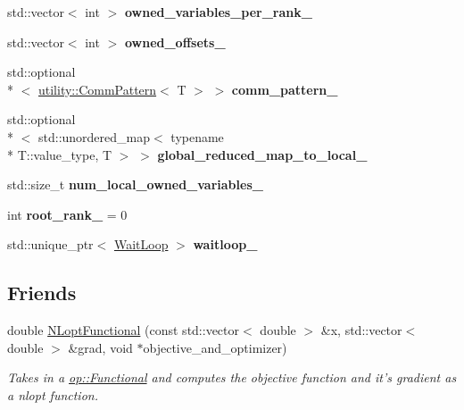 \begin{DoxyCompactItemize}
\item 
\hypertarget{classop_1_1NLopt_ad38e598bdc610c3dcc6c4611cf1333e1}{std\-::vector$<$ int $>$ {\bfseries owned\-\_\-variables\-\_\-per\-\_\-rank\-\_\-}}\label{classop_1_1NLopt_ad38e598bdc610c3dcc6c4611cf1333e1}

\item 
\hypertarget{classop_1_1NLopt_a1376429626ecfd58dea3ea99e0b258c9}{std\-::vector$<$ int $>$ {\bfseries owned\-\_\-offsets\-\_\-}}\label{classop_1_1NLopt_a1376429626ecfd58dea3ea99e0b258c9}

\item 
\hypertarget{classop_1_1NLopt_a6595246d545758fe572dc1f786155dd3}{std\-::optional\\*
$<$ \hyperlink{structop_1_1utility_1_1CommPattern}{utility\-::\-Comm\-Pattern}$<$ T $>$ $>$ {\bfseries comm\-\_\-pattern\-\_\-}}\label{classop_1_1NLopt_a6595246d545758fe572dc1f786155dd3}

\item 
\hypertarget{classop_1_1NLopt_a25e6ed69156a0554a3d705d263bcf46a}{std\-::optional\\*
$<$ std\-::unordered\-\_\-map$<$ typename \\*
T\-::value\-\_\-type, T $>$ $>$ {\bfseries global\-\_\-reduced\-\_\-map\-\_\-to\-\_\-local\-\_\-}}\label{classop_1_1NLopt_a25e6ed69156a0554a3d705d263bcf46a}

\item 
\hypertarget{classop_1_1NLopt_a8d375f203c2f7a4786d2ee3d17be4ec0}{std\-::size\-\_\-t {\bfseries num\-\_\-local\-\_\-owned\-\_\-variables\-\_\-}}\label{classop_1_1NLopt_a8d375f203c2f7a4786d2ee3d17be4ec0}

\item 
\hypertarget{classop_1_1NLopt_a77c36eaeb9124a0886f8224735684433}{int {\bfseries root\-\_\-rank\-\_\-} = 0}\label{classop_1_1NLopt_a77c36eaeb9124a0886f8224735684433}

\item 
\hypertarget{classop_1_1NLopt_a5441290e7186be77f81626bb31ba8fa2}{std\-::unique\-\_\-ptr$<$ \hyperlink{classop_1_1WaitLoop}{Wait\-Loop} $>$ {\bfseries waitloop\-\_\-}}\label{classop_1_1NLopt_a5441290e7186be77f81626bb31ba8fa2}

\end{DoxyCompactItemize}
\subsection*{Friends}
\begin{DoxyCompactItemize}
\item 
double \hyperlink{classop_1_1NLopt_a29d5ab6d03460755684ce25f13da7ae5}{N\-Lopt\-Functional} (const std\-::vector$<$ double $>$ \&x, std\-::vector$<$ double $>$ \&grad, void $\ast$objective\-\_\-and\-\_\-optimizer)
\begin{DoxyCompactList}\small\item\em Takes in a \hyperlink{classop_1_1Functional}{op\-::\-Functional} and computes the objective function and it's gradient as a nlopt function. \end{DoxyCompactList}\end{DoxyCompactItemize}

